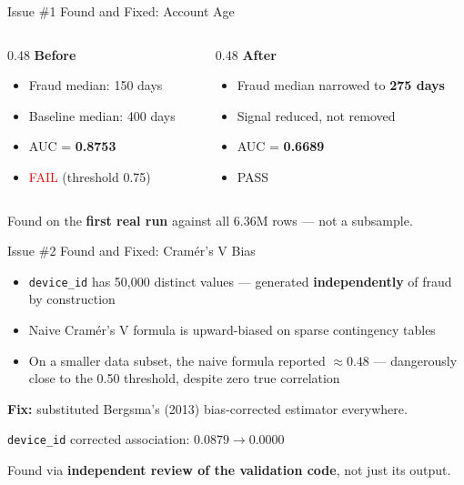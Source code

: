 \documentclass[aspectratio=169]{beamer}
\begin{document}
\begin{frame}{Issue \#1 Found and Fixed: Account Age}
\begin{columns}
\begin{column}{0.48\textwidth}
\textbf{Before}
\begin{itemize}
    \item Fraud median: 150 days
    \item Baseline median: 400 days
    \item AUC = \textbf{0.8753}
    \item \textcolor{red}{FAIL} (threshold 0.75)
\end{itemize}
\end{column}
\begin{column}{0.48\textwidth}
\textbf{After}
\begin{itemize}
    \item Fraud median narrowed to \textbf{275 days}
    \item Signal reduced, not removed
    \item AUC = \textbf{0.6689}
    \item \textcolor{green!50!black}{PASS}
\end{itemize}
\end{column}
\end{columns}
\vspace{0.4cm}
Found on the \textbf{first real run} against all 6.36M rows --- not a subsample.
\end{frame}

\begin{frame}{Issue \#2 Found and Fixed: Cram\'er's V Bias}
\begin{itemize}
    \item \texttt{device\_id} has 50,000 distinct values --- generated \textbf{independently} of fraud by construction
    \item Naive Cram\'er's V formula is upward-biased on sparse contingency tables
    \item On a smaller data subset, the naive formula reported \(\approx 0.48\) --- dangerously close to the 0.50 threshold, despite zero true correlation
\end{itemize}
\vspace{0.3cm}
\textbf{Fix:} substituted Bergsma's (2013) bias-corrected estimator everywhere.
\vspace{0.3cm}
\begin{center}
\texttt{device\_id} corrected association: \(0.0879 \rightarrow \mathbf{0.0000}\)
\end{center}
Found via \textbf{independent review of the validation code}, not just its output.
\end{frame}
\end{document}
